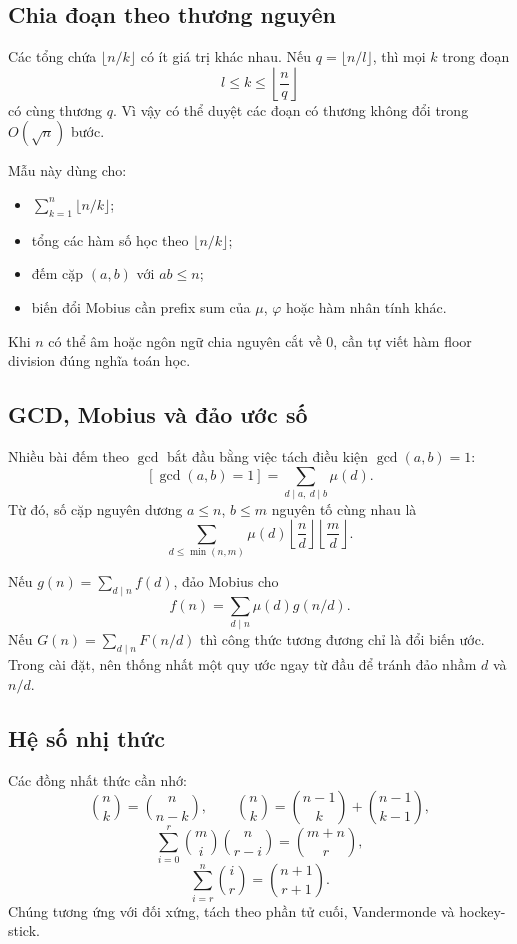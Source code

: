 \documentclass[11pt]{article}
\begin{document}
\subsection{Chia đoạn theo thương nguyên}

Các tổng chứa \(\lfloor n/k\rfloor\) có ít giá trị khác nhau. Nếu
\(q=\lfloor n/l\rfloor\), thì mọi \(k\) trong đoạn
\[
  l\le k\le \left\lfloor\frac{n}{q}\right\rfloor
\]
có cùng thương \(q\). Vì vậy có thể duyệt các đoạn có thương không đổi trong
\(O(\sqrt n)\) bước.

Mẫu này dùng cho:
\begin{itemize}
  \item \(\sum_{k=1}^n \lfloor n/k\rfloor\);
  \item tổng các hàm số học theo \(\lfloor n/k\rfloor\);
  \item đếm cặp \((a,b)\) với \(ab\le n\);
  \item biến đổi Mobius cần prefix sum của \(\mu\), \(\varphi\) hoặc hàm nhân
        tính khác.
\end{itemize}
Khi \(n\) có thể âm hoặc ngôn ngữ chia nguyên cắt về 0, cần tự viết hàm floor
division đúng nghĩa toán học.

\subsection{GCD, Mobius và đảo ước số}

Nhiều bài đếm theo \(\gcd\) bắt đầu bằng việc tách điều kiện
\(\gcd(a,b)=1\):
\[
  [\gcd(a,b)=1]=\sum_{d\mid a,\ d\mid b}\mu(d).
\]
Từ đó, số cặp nguyên dương \(a\le n\), \(b\le m\) nguyên tố cùng nhau là
\[
  \sum_{d\le \min(n,m)} \mu(d)
  \left\lfloor\frac{n}{d}\right\rfloor
  \left\lfloor\frac{m}{d}\right\rfloor.
\]

Nếu \(g(n)=\sum_{d\mid n}f(d)\), đảo Mobius cho
\[
  f(n)=\sum_{d\mid n}\mu(d)g(n/d).
\]
Nếu \(G(n)=\sum_{d\mid n}F(n/d)\) thì công thức tương đương chỉ là đổi biến ước.
Trong cài đặt, nên thống nhất một quy ước ngay từ đầu để tránh đảo nhầm \(d\)
và \(n/d\).

\subsection{Hệ số nhị thức}

Các đồng nhất thức cần nhớ:
\[
  \binom{n}{k}=\binom{n}{n-k},\qquad
  \binom{n}{k}=\binom{n-1}{k}+\binom{n-1}{k-1},
\]
\[
  \sum_{i=0}^{r}\binom{m}{i}\binom{n}{r-i}
  =\binom{m+n}{r},
\]
\[
  \sum_{i=r}^{n}\binom{i}{r}=\binom{n+1}{r+1}.
\]
Chúng tương ứng với đối xứng, tách theo phần tử cuối, Vandermonde và
hockey-stick.
\end{document}

